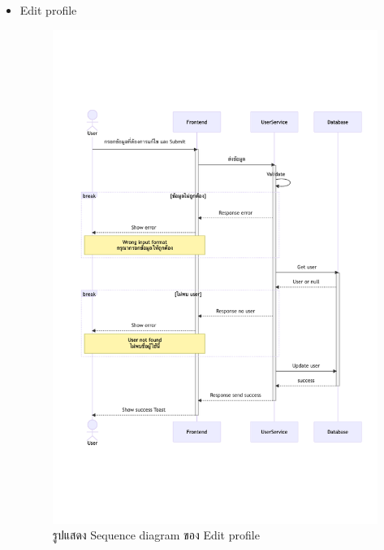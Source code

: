 \documentclass[12pt,oneside,openright,a4paper]{cpe-thai-project}
\begin{document}
\begin{itemize}
    \newpage
    \item Edit profile \\
    \begin{figure}[!ht]\centering
        \includegraphics[width=13cm, trim={0 6cm 0 6cm},clip]{./assets/sequence-diagram/edit-profile.png}
        \caption{รูปแสดง Sequence diagram ของ Edit profile}\label{fig:sqEditProfile}
    \end{figure}


\end{itemize}
\end{document}
